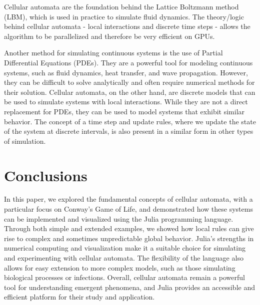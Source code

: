 \documentclass[a4paper,12pt]{llncs}
\numberwithin{equation}{section}
\begin{document}
Cellular automata are the foundation behind the Lattice Boltzmann method (LBM), which is used in practice to simulate fluid dynamics.
The theory/logic behind cellular automata - local interactions and discrete time steps - allows the algorithm to be parallelized and therefore be very efficient on GPUs.

Another method for simulating continuous systems is the use of Partial Differential Equations (PDEs).
They are a powerful tool for modeling continuous systems, such as fluid dynamics, heat transfer, and wave propagation.
However, they can be difficult to solve analytically and often require numerical methods for their solution.
Cellular automata, on the other hand, are discrete models that can be used to simulate systems with local interactions.
While they are not a direct replacement for PDEs, they can be used to model systems that exhibit similar behavior.
The concept of a time step and update rules, where we update the state of the system at discrete intervals, is also present in a similar form in other types of simulation.

\section{Conclusions}
In this paper, we explored the fundamental concepts of cellular automata, with a particular focus on Conway's Game of Life,
and demonstrated how these systems can be implemented and visualized using the Julia programming language.
Through both simple and extended examples, we showed how local rules can give rise to complex and sometimes unpredictable global behavior.
Julia's strengths in numerical computing and visualization make it a suitable choice for simulating and experimenting with cellular automata.
The flexibility of the language also allows for easy extension to more complex models, such as those simulating biological processes or infections.
Overall, cellular automata remain a powerful tool for understanding emergent phenomena,
and Julia provides an accessible and efficient platform for their study and application.



\end{document}
